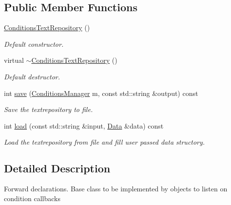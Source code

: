 \subsection*{Public Member Functions}
\begin{DoxyCompactItemize}
\item 
\hyperlink{class_d_d4hep_1_1_conditions_1_1_conditions_text_repository_ae00798ba3a2736978fc0b9c3a9325abe}{ConditionsTextRepository} ()
\begin{DoxyCompactList}\small\item\em Default constructor. \item\end{DoxyCompactList}\item 
virtual \hyperlink{class_d_d4hep_1_1_conditions_1_1_conditions_text_repository_af70e49d05e4819f28d4516fab871bd69}{$\sim$ConditionsTextRepository} ()
\begin{DoxyCompactList}\small\item\em Default destructor. \item\end{DoxyCompactList}\item 
int \hyperlink{class_d_d4hep_1_1_conditions_1_1_conditions_text_repository_abcba5f6f77c255256bbc25642e269eb4}{save} (\hyperlink{class_d_d4hep_1_1_conditions_1_1_conditions_manager}{ConditionsManager} m, const std::string \&output) const 
\begin{DoxyCompactList}\small\item\em Save the textrepository to file. \item\end{DoxyCompactList}\item 
int \hyperlink{class_d_d4hep_1_1_conditions_1_1_conditions_text_repository_af8b9dd41da9a9d1598e471fe164ccd04}{load} (const std::string \&input, \hyperlink{class_d_d4hep_1_1_conditions_1_1_conditions_text_repository_afe5d8989bf0bcd711e59f838943b5115}{Data} \&data) const 
\begin{DoxyCompactList}\small\item\em Load the textrepository from file and fill user passed data structory. \item\end{DoxyCompactList}\end{DoxyCompactItemize}


\subsection{Detailed Description}
Forward declarations. Base class to be implemented by objects to listen on condition callbacks

